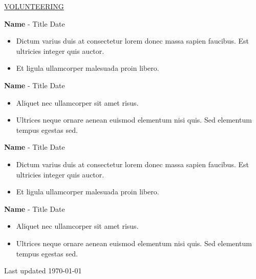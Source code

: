 \documentclass[11pt]{article}
\newcommand{\betteruline}[1]{
    \uline{#1}
}
\newcommand{\sectiontitle}[1]{
    \begingroup
        \titlebold
        \betteruline{\Large\uppercase{#1}  }
        \vspace{1.7mm}
    \endgroup
}
\newcommand{\sectioncontent}[1]{
    \begingroup
        \begin{FlushLeft}
        \vspace{-3mm}
        \sffamily\small#1
        \end{FlushLeft}
    \endgroup
    \vspace{2mm}
}
\newcommand{\job}[3]{
    \begingroup
        \textbf{\small#1} - \small#2
        \hfill\color{black!70}\small{#3}
    \endgroup
}
\newcommand{\spacevv}{
    \vspace{2mm}
}
\begin{document}
\begin{paracol}{2}
    \sectiontitle{volunteering}
    \sectioncontent{
      
          \job{Name}{Title}{Date}
          \begin{itemize}
            \item Dictum varius duis at consectetur lorem donec massa sapien faucibus. Est ultricies integer quis auctor. 
            \item Et ligula ullamcorper malesuada proin libero. 
          \end{itemize}
          \spacevv
        
          \job{Name}{Title}{Date}
          \begin{itemize}
            \item Aliquet nec ullamcorper sit amet risus. 
            \item Ultrices neque ornare aenean euismod elementum nisi quis. Sed elementum tempus egestas sed.
          \end{itemize}
        
          \job{Name}{Title}{Date}
          \begin{itemize}
            \item Dictum varius duis at consectetur lorem donec massa sapien faucibus. Est ultricies integer quis auctor. 
            \item Et ligula ullamcorper malesuada proin libero. 
          \end{itemize}
          \spacevv
        
          \job{Name}{Title}{Date}
          \begin{itemize}
            \item Aliquet nec ullamcorper sit amet risus. 
            \item Ultrices neque ornare aenean euismod elementum nisi quis. Sed elementum tempus egestas sed.
          \end{itemize}
    }

    \normaltext \hfill \tiny Last updated \today

    \end{paracol}
\end{document}
